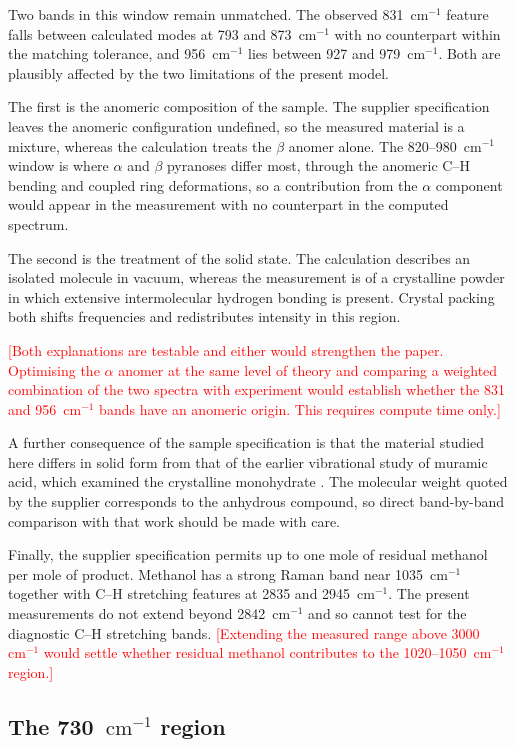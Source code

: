 \documentclass[preprint,12pt]{elsarticle}
\newcommand{\wn}{\ensuremath{\mathrm{cm}^{-1}}}
\newcommand{\authorcheck}[1]{\textcolor{red}{[#1]}}
\begin{document}
Two bands in this window remain unmatched. The observed 831~\wn{} feature falls
between calculated modes at 793 and 873~\wn{} with no counterpart within the
matching tolerance, and 956~\wn{} lies between 927 and 979~\wn{}. Both are
plausibly affected by the two limitations of the present model.

The first is the anomeric composition of the sample. The supplier specification
leaves the anomeric configuration undefined, so the measured material is a
mixture, whereas the calculation treats the $\beta$ anomer alone. The
820--980~\wn{} window is where $\alpha$ and $\beta$ pyranoses differ most,
through the anomeric C--H bending and coupled ring deformations, so a
contribution from the $\alpha$ component would appear in the measurement with
no counterpart in the computed spectrum.

The second is the treatment of the solid state. The calculation describes an
isolated molecule in vacuum, whereas the measurement is of a crystalline powder
in which extensive intermolecular hydrogen bonding is present. Crystal packing
both shifts frequencies and redistributes intensity in this region.

\authorcheck{Both explanations are testable and either would strengthen the
paper. Optimising the $\alpha$ anomer at the same level of theory and comparing
a weighted combination of the two spectra with experiment would establish
whether the 831 and 956~\wn{} bands have an anomeric origin. This requires
compute time only.}

A further consequence of the sample specification is that the material studied
here differs in solid form from that of the earlier vibrational study of muramic
acid, which examined the crystalline monohydrate \cite{kouach1994}. The
molecular weight quoted by the supplier corresponds to the anhydrous compound,
so direct band-by-band comparison with that work should be made with care.

Finally, the supplier specification permits up to one mole of residual methanol
per mole of product. Methanol has a strong Raman band near 1035~\wn{} together
with C--H stretching features at 2835 and 2945~\wn{}. The present measurements
do not extend beyond 2842~\wn{} and so cannot test for the diagnostic C--H
stretching bands.
\authorcheck{Extending the measured range above 3000~\wn{} would settle whether
residual methanol contributes to the 1020--1050~\wn{} region.}

\subsection{The 730~\wn{} region}
\end{document}
